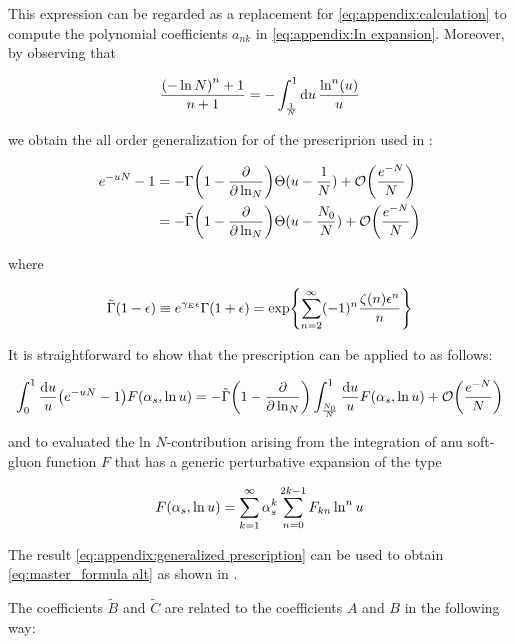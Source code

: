 \documentclass[../main.tex]{subfiles}
\begin{document}
This expression can be regarded as a replacement for \cref{eq:appendix:calculation} to compute the polynomial coefficients $a_{nk}$ 
in \cref{eq:appendix:In expansion}. Moreover, by observing that 

\begin{equation}
    \frac{ \qty(-\ln N)^n+1}{n+1} = -\int_{\frac{1}{N}}^1 \dd{u} \frac{\ln^n(u)}{u}
\end{equation}

we obtain the all order generalization for of the prescriprion used in \cite{CATANI19933}:

\begin{align}
    e^{-uN}-1 &= -\Gamma\qty(1-\pdv{\ln_N}) \Theta(u-\frac{1}{N}) + \order{\frac{e^{-N}}{N}}\\
              &=  -\tilde{\Gamma}\qty(1-\pdv{\ln_N}) \Theta(u-\frac{N_0}{N}) + \order{\frac{e^{-N}}{N}}
\end{align}

where 

\begin{equation}
    \tilde{\Gamma}\qty(1-\epsilon) \equiv e^{\gamma_E \epsilon} \Gamma(1+\epsilon) = \exp{\sum_{n=2}^\infty (-1)^n \frac{ \zeta(n) \epsilon^n}{n}}
\end{equation}

It is straightforward to show that the prescription can be applied to as follows:

\begin{equation} \label{eq:appendix:generalized prescription}
    \int_0^1 \frac{\dd{u}}{u} \qty(e^{-u N} - 1) F\qty(\alpha_s , \ln u) = -\tilde{\Gamma}\qty(1-\pdv{\ln_N}) \int_{\frac{N_0}{N}}^1 \frac{\dd{u}}{u} F\qty(\alpha_s , \ln u) + \order{\frac{e^{-N}}{N}}
\end{equation}
    
and to evaluated the ln $N$-contribution arising from the integration of anu soft-gluon function $F$ that has a generic perturbative expansion of the type

\begin{equation}
    F\qty(\alpha_s , \ln u) = \sum_{k=1}^\infty \alpha_s^k \sum_{n=0}^{2k-1} F_{kn}\ln^n u
\end{equation}

The result \cref{eq:appendix:generalized prescription} can be used to obtain \cref{eq:master_formula alt} as shown in \cite{Catani_2003_appendix}.

The coefficients $\tilde{B}$ and $\tilde{C}$ are related to the coefficients $A$ and $B$ in the following way:
\end{document}
